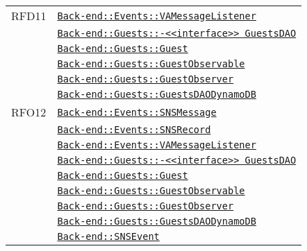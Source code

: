 \begin{longtable}{|>{\centering}m{3cm}|m{10cm}<{\centering}|}
RFD11 & \hyperref[Back-end::Events::VAMessageListener]{\texttt{Back-end::Events::VAMessageListener}}\\
& \hyperref[Back-end::Guests::<<interface>> GuestsDAO]{\texttt{Back-end::Guests::-\linebreak <<interface>> GuestsDAO}}\\
& \hyperref[Back-end::Guests::Guest]{\texttt{Back-end::Guests::Guest}}\\
& \hyperref[Back-end::Guests::GuestObservable]{\texttt{Back-end::Guests::GuestObservable}}\\
& \hyperref[Back-end::Guests::GuestObserver]{\texttt{Back-end::Guests::GuestObserver}}\\
& \hyperref[Back-end::Guests::GuestsDAODynamoDB]{\texttt{Back-end::Guests::GuestsDAODynamoDB}}\\ \hline

RFO12 & \hyperref[Back-end::Events::SNSMessage]{\texttt{Back-end::Events::SNSMessage}}\\
& \hyperref[Back-end::Events::SNSRecord]{\texttt{Back-end::Events::SNSRecord}}\\
& \hyperref[Back-end::Events::VAMessageListener]{\texttt{Back-end::Events::VAMessageListener}}\\
& \hyperref[Back-end::Guests::<<interface>> GuestsDAO]{\texttt{Back-end::Guests::-\linebreak <<interface>> GuestsDAO}}\\
& \hyperref[Back-end::Guests::Guest]{\texttt{Back-end::Guests::Guest}}\\
& \hyperref[Back-end::Guests::GuestObservable]{\texttt{Back-end::Guests::GuestObservable}}\\
& \hyperref[Back-end::Guests::GuestObserver]{\texttt{Back-end::Guests::GuestObserver}}\\
& \hyperref[Back-end::Guests::GuestsDAODynamoDB]{\texttt{Back-end::Guests::GuestsDAODynamoDB}}\\
& \hyperref[Back-end::SNSEvent]{\texttt{Back-end::SNSEvent}}\\ \hline


\end{longtable}

